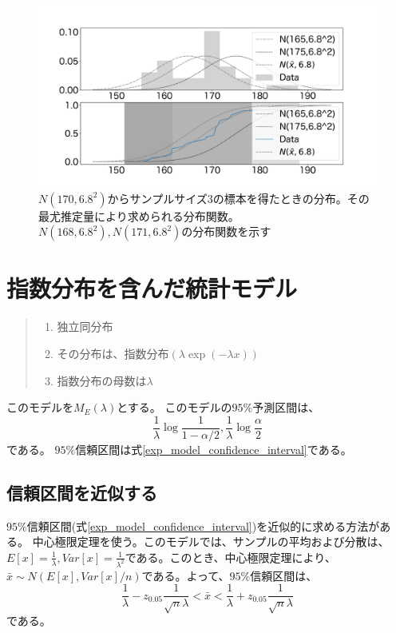 \begin{figure}
    \begin{center}
        \includegraphics[width=15cm]{./image/02_/maximum_likelihood_false_30.pdf}
        \caption{$N(170,6.8^2)$からサンプルサイズ$3$の標本を得たときの分布。その最尤推定量により求められる分布関数。$N(168,6.8^2),N(171,6.8^2)$の分布関数を示す}
        \label{fig:maximum_likelihood_false_30}
    \end{center}
\end{figure}

\fi

\section{指数分布を含んだ統計モデル}
\begin{quote}
    \begin{enumerate}[(1)]
    \item 独立同分布
    \item その分布は、指数分布$(\lambda\exp{(-\lambda x)})$
    \item 指数分布の母数は$\lambda$
    \end{enumerate}
\end{quote}
このモデルを$M_E(\lambda)$とする。
このモデルの$95\%$予測区間は、
\begin{equation*}
    \frac{1}{\lambda} \log\frac{1}{1-\alpha/2} ,\frac{1}{\lambda}\log\frac{\alpha}{2}    
\end{equation*}
である。
$95\%$信頼区間は式\ref{exp_model_confidence_interval}である。


\subsection{信頼区間を近似する}
$95\%$信頼区間(式\ref{exp_model_confidence_interval})を近似的に求める方法がある。
中心極限定理を使う。このモデルでは、サンプルの平均および分散は、$E[x]=\frac{1}{\lambda},Var[x]=\frac{1}{\lambda^2}$である。このとき、中心極限定理により、$\bar{x}\sim N(E[x],Var[x]/n)$である。よって、$95\%$信頼区間は、
\begin{equation*}
    \frac{1}{\lambda}-z_{0.05}\frac{1}{\sqrt{n}\lambda}<\bar{x}<\frac{1}{\lambda}+z_{0.05}\frac{1}{\sqrt{n}\lambda}
\end{equation*}
である。

